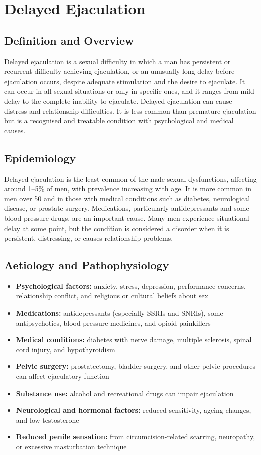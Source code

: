 \chapter{Delayed Ejaculation}

\section*{Definition and Overview}
Delayed ejaculation is a sexual difficulty in which a man has persistent or recurrent difficulty achieving ejaculation, or an unusually long delay before ejaculation occurs, despite adequate stimulation and the desire to ejaculate. It can occur in all sexual situations or only in specific ones, and it ranges from mild delay to the complete inability to ejaculate. Delayed ejaculation can cause distress and relationship difficulties. It is less common than premature ejaculation but is a recognised and treatable condition with psychological and medical causes.

\section*{Epidemiology}
Delayed ejaculation is the least common of the male sexual dysfunctions, affecting around 1--5\% of men, with prevalence increasing with age. It is more common in men over 50 and in those with medical conditions such as diabetes, neurological disease, or prostate surgery. Medications, particularly antidepressants and some blood pressure drugs, are an important cause. Many men experience situational delay at some point, but the condition is considered a disorder when it is persistent, distressing, or causes relationship problems.

\section*{Aetiology and Pathophysiology}
\begin{itemize}
    \item \textbf{Psychological factors:} anxiety, stress, depression, performance concerns, relationship conflict, and religious or cultural beliefs about sex
    \item \textbf{Medications:} antidepressants (especially SSRIs and SNRIs), some antipsychotics, blood pressure medicines, and opioid painkillers
    \item \textbf{Medical conditions:} diabetes with nerve damage, multiple sclerosis, spinal cord injury, and hypothyroidism
    \item \textbf{Pelvic surgery:} prostatectomy, bladder surgery, and other pelvic procedures can affect ejaculatory function
    \item \textbf{Substance use:} alcohol and recreational drugs can impair ejaculation
    \item \textbf{Neurological and hormonal factors:} reduced sensitivity, ageing changes, and low testosterone
    \item \textbf{Reduced penile sensation:} from circumcision-related scarring, neuropathy, or excessive masturbation technique
\end{itemize}


